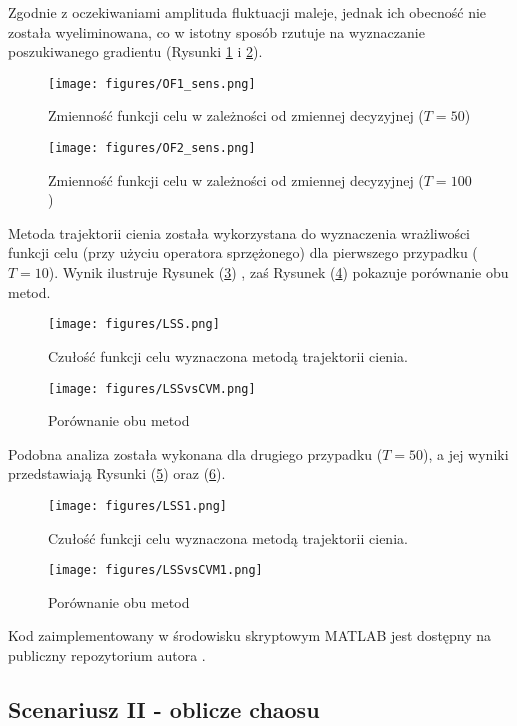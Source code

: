 \documentclass[12pt]{article}
\begin{document}
Zgodnie z oczekiwaniami amplituda fluktuacji maleje, jednak ich obecność nie została wyeliminowana, co w istotny sposób rzutuje na wyznaczanie poszukiwanego gradientu (Rysunki \ref{Fig20} i \ref{Fig21}).
\begin{figure}[H]
	\texttt{[image: figures/OF1\_sens.png]} 
	\centering
	\caption{Zmienność funkcji celu w zależności od zmiennej decyzyjnej ($ T=50 $)}
	\label{Fig20}
\end{figure}
\begin{figure}[H]
	\texttt{[image: figures/OF2\_sens.png]} 
	\centering
	\caption{Zmienność funkcji celu w zależności od zmiennej decyzyjnej ($ T=100 $)}
	\label{Fig21}
\end{figure}
Metoda trajektorii cienia została wykorzystana do wyznaczenia wrażliwości funkcji celu (przy użyciu operatora sprzężonego) dla pierwszego przypadku ($ T=10 $). Wynik ilustruje Rysunek (\ref{Fig22}) , zaś Rysunek (\ref{Fig23}) pokazuje porównanie obu metod.
\begin{figure}[H]
	\texttt{[image: figures/LSS.png]} 
	\centering
	\caption{Czułość funkcji celu wyznaczona metodą trajektorii cienia.}
	\label{Fig22}
\end{figure}
\begin{figure}[H]
	\texttt{[image: figures/LSSvsCVM.png]} 
	\centering
	\caption{Porównanie obu metod}
	\label{Fig23}
\end{figure}
Podobna analiza została wykonana dla drugiego przypadku ($ T=50 $), a jej wyniki przedstawiają Rysunki  (\ref{Fig24}) oraz (\ref{Fig25}).
\begin{figure}[H]
	\texttt{[image: figures/LSS1.png]} 
	\centering
	\caption{Czułość funkcji celu wyznaczona metodą trajektorii cienia.}
	\label{Fig24}
\end{figure}
\begin{figure}[H]
	\texttt{[image: figures/LSSvsCVM1.png]} 
	\centering
	\caption{Porównanie obu metod}
	\label{Fig25}
\end{figure}
Kod zaimplementowany w środowisku skryptowym MATLAB jest dostępny na publiczny repozytorium autora \cite{Marek1}.
\subsection{Scenariusz II - oblicze chaosu}
\end{document}
